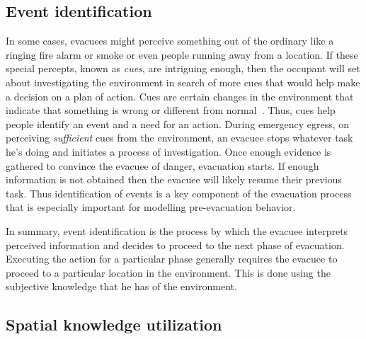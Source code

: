 \subsection{Event identification}
\label{IBEVAC:EventIdentification}

	  In some cases, evacuees might perceive something out of the ordinary like a ringing fire alarm or smoke or even people running away from a location. If these special percepts, known as \emph{cues}, are intriguing enough, then the occupant will set about investigating the environment in search of more cues that would help make a decision on a plan of action. Cues are certain changes in the environment that indicate that something is wrong or different from normal~\cite{Sime:1983uy}. Thus, cues help people identify an event and a need for an action. During emergency egress, on perceiving \emph{sufficient} cues from the environment, an evacuee stops whatever task he's doing and initiates a process of investigation. Once enough evidence is gathered to convince the evacuee of danger, evacuation starts. If enough information is not obtained then the evacuee will likely resume their previous task. Thus identification of events is a key component of the evacuation process that is especially important for modelling pre-evacuation behavior.


    In summary, event identification is the process by which the evacuee interprets perceived information and decides to proceed to the next phase of evacuation. Executing the action for a particular phase generally requires the evacuee to proceed to a particular location in the environment. This is done using the subjective knowledge that he has of the environment.

\subsection{Spatial knowledge utilization}
\label{IBEVAC:Knowledge}


